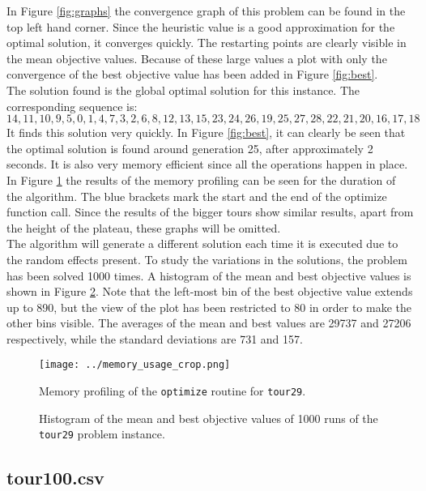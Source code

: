 \documentclass[a4paper,10pt]{article}
\begin{document}
In Figure \ref{fig:graphs} the convergence graph of this problem can be found in the top left hand corner. Since the heuristic value is a good approximation for the optimal solution, it converges quickly. The restarting points are clearly visible in the mean objective values. Because of these large values a plot with only the convergence of the best objective value has been added in Figure \ref{fig:best}.\\
The solution found is the global optimal solution for this instance. The corresponding sequence is:
$$14,11,10,9,5,0,1,4,7,3,2,6,8,12,13,15,23,24,26,19,25,27,28,22,21,20,16,17,18$$
It finds this solution very quickly. In Figure \ref{fig:best}, it can clearly be seen that the optimal solution is found around generation 25, after approximately 2 seconds. It is also very memory efficient since all the operations happen in place. In Figure \ref{fig:memory} the results of the memory profiling can be seen for the duration of the algorithm. The blue brackets mark the start and the end of the optimize function call. Since the results of the bigger tours show similar results, apart from the height of the plateau, these graphs will be omitted.\\
The algorithm will generate a different solution each time it is executed due to the random effects present. To study the variations in the solutions, the problem has been solved 1000 times. A histogram of the mean and best objective values is shown in Figure \ref{fig:histogram}. Note that the left-most bin of the best objective value extends up to 890, but the view of the plot has been restricted to 80 in order to make the other bins visible. The averages of the mean and best values are 29737 and 27206 respectively, while the standard deviations are 731 and 157.

\begin{figure}
\centering
\texttt{[image: ../memory\_usage\_crop.png]}
\caption{Memory profiling of the \texttt{optimize} routine for \texttt{tour29}.}
\label{fig:memory}
\end{figure}

\begin{figure}
\centering

\caption{Histogram of the mean and best objective values of 1000 runs of the \texttt{tour29} problem instance.}
\label{fig:histogram}
\end{figure}

\subsection{tour100.csv}
\end{document}
